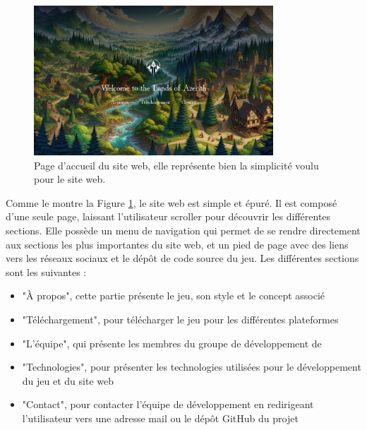 \begin{figure}[H]
    \centering
    \includegraphics[width=0.8\textwidth]{assets/website1.png}
    \caption{Page d'accueil du site web, elle représente bien la simplicité voulu pour le site web.}
    \label{fig:website1}
\end{figure}

Comme le montre la Figure \ref*{fig:website1}, le site web est simple et épuré.
Il est composé d'une seule page, laissant l'utilisateur scroller pour découvrir les différentes sections.
Elle possède un menu de navigation qui permet de se rendre directement aux sections les plus importantes du site web, et un pied de page avec des liens vers les réseaux sociaux et le dépôt de code source du jeu.
Les différentes sections sont les suivantes :
\\

\begin{itemize}

    \item "À propos", cette partie présente le jeu, son style et le concept associé
          \\

    \item "Téléchargement", pour télécharger le jeu pour les différentes plateformes
          \\

    \item "L'équipe", qui présente les membres du groupe de développement de \gameName
          \\

    \item "Technologies", pour présenter les technologies utilisées pour le développement du jeu et du site web
          \\

    \item "Contact", pour contacter l'équipe de développement en redirigeant l'utilisateur vers une adresse mail ou le dépôt GitHub du projet

\end{itemize}

